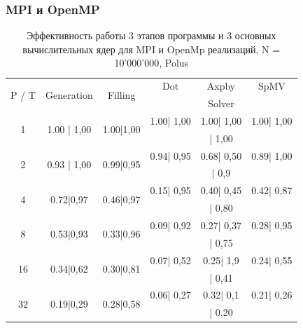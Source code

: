 		\subsubsection{MPI и OpenMP}
		\begin{table}[H]
			\centering
			\begin{tabular}{|c||c|c|c|c|c|}
				\hline
				\multirow{2}{*}{P / T} &  \multirow{2}{*}{Generation} & \multirow{2}{*}{Filling} & Dot & Axpby & SpMV\\ \cline{4-6}
				                   &                              &                         & \multicolumn{3}{c|}{Solver} \\ \hline
                \multirow{2}{*}{1} & \multirow{2}{*}{1.00 | 1,00} & \multirow{2}{*}{1.00|1,00} & 1.00| 1,00& 1.00| 1,00&  1.00| 1,00\\ \cline{4-6}
                                   &                   &                   & \multicolumn{3}{c|}{| 1,00}   \\ \hline
                \multirow{2}{*}{2} & \multirow{2}{*}{0.93 | 1,00} & \multirow{2}{*}{0.99|0,95} & 0.94| 0,95& 0.68| 0,50&  0.89| 1,00\\ \cline{4-6}
                                   &                   &                   & \multicolumn{3}{c|}{| 0,9}   \\ \hline
                \multirow{2}{*}{4} & \multirow{2}{*}{0.72|0,97} & \multirow{2}{*}{0.46|0,97} & 0.15| 0,95& 0.40| 0,45&  0.42| 0,87\\ \cline{4-6}
                                   &                   &                   & \multicolumn{3}{c|}{| 0,80}   \\ \hline
                \multirow{2}{*}{8} & \multirow{2}{*}{0.53|0,93} & \multirow{2}{*}{0.33|0,96} & 0.09| 0,92& 0.27| 0,37&  0.28| 0,95\\ \cline{4-6}
                                   &                   &                   & \multicolumn{3}{c|}{| 0,75}   \\ \hline
                \multirow{2}{*}{16} & \multirow{2}{*}{0.34|0,62} & \multirow{2}{*}{0.30|0,81} & 0.07| 0,52& 0.25| 1,9& 0.24| 0,55\\ \cline{4-6}
                                   &                   &                   & \multicolumn{3}{c|}{| 0,41}   \\ \hline
                \multirow{2}{*}{32} & \multirow{2}{*}{0.19|0,29} & \multirow{2}{*}{0.28|0,58} & 0.06| 0,27& 0.32| 0,1& 0.21| 0,26\\ \cline{4-6}
                                   &                   &                   & \multicolumn{3}{c|}{| 0,20}   \\ \hline
			\end{tabular}
			\caption{Эффективность работы 3 этапов программы и 3 основных вычислительных ядер для MPI и OpenMp реализаций, N = 10'000'000, Polus}
			\label{par_1}
		\end{table}
		

\clearpage
